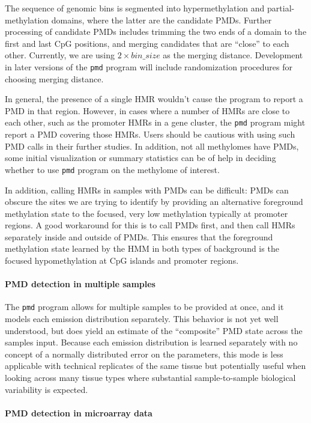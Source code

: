 \documentclass[10pt]{article}
\newcommand{\prog}[1]{\texttt{#1}}
\begin{document}
The sequence of genomic bins is
segmented into hypermethylation and partial-methylation domains, where
the latter are the candidate PMDs. Further processing of candidate
PMDs includes trimming the two ends of a domain to the first and last
CpG positions, and merging candidates that are ``close'' to each
other. Currently, we are using $2\times bin\_size$ as the merging
distance. Development in later versions of the \prog{pmd} program will
include randomization procedures for choosing merging distance. 

In general, the presence of a single HMR wouldn't cause the program to
report a PMD in that region. However, in cases where a number of HMRs
are close to each other, such as the promoter HMRs in a gene cluster,
the \prog{pmd} program might report a PMD covering those HMRs. Users
should be cautious with using such PMD calls in their further
studies. In addition, not all methylomes have PMDs, some initial
visualization or summary statistics can be of help in deciding whether
to use \prog{pmd} program on the methylome of interest.

In addition, calling HMRs in samples with PMDs can be difficult: PMDs
can obscure the sites we are trying to identify by providing an alternative
foreground methylation state to the focused, very low methylation typically
at promoter regions. A good workaround for this is to call PMDs first, and
then call HMRs separately inside and outside of PMDs. This ensures that
the foreground methylation state learned by the HMM in both types of background
is the focused hypomethylation at CpG islands and promoter regions.

\paragraph{PMD detection in multiple samples}

The \prog{pmd} program allows for multiple samples to be provided at once,
and it models each emission distribution separately. This behavior is not yet
well understood, but does yield an estimate of the ``composite'' PMD state
across the samples input. Because each emission distribution is learned
separately with no concept of a normally distributed error on the parameters,
this mode is less applicable with technical replicates of the same tissue but
potentially useful when looking across many tissue types where substantial
sample-to-sample biological variability is expected.

\paragraph{PMD detection in microarray data}
\end{document}
